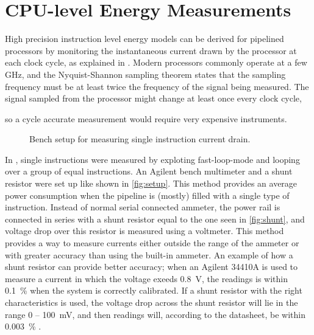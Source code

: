 \section{CPU-level Energy Measurements}
\label{sec:energymeasure}

High precision instruction level energy models can be derived for pipelined
processors by monitoring the instantaneous current drawn by the processor at
each clock cycle, as explained in \cite{nikolaidis2005instruction}. Modern
processors commonly operate at a few GHz, and the Nyquist-Shannon sampling theorem
\cite{nyquist1928certain} states that the sampling frequency must be at least
twice the frequency of the signal being measured. The signal sampled from the
processor might change at least once every clock cycle,

so a cycle accurate
measurement would require very expensive instruments.

\begin{figure}[tbh]
    \centering
    
    \caption{Bench setup for measuring single instruction current drain.}
    \label{fig:setup}
\end{figure}

In \cite{rundehvatum2013exploring}, single instructions were measured by
exploting fast-loop-mode and looping over a group of equal instructions. An
Agilent bench multimeter and a shunt resistor were set up like shown in
\autoref{fig:setup}. This method provides an average power consumption when the
pipeline is (mostly) filled with a single type of instruction. Instead of normal
serial connected ammeter, the power rail is connected in series with a shunt
resistor equal to the one seen in \autoref{fig:shunt}, and voltage drop over
this resistor is measured using a voltmeter. This method provides a way to
measure currents either outside the range of the ammeter or with greater
accuracy than using the built-in ammeter. An example of how a shunt resistor can
provide better accuracy; when an Agilent 34410A is used to measure a current in
which the voltage exeeds 0.8~V, the readings is within 0.1~\% when the system is
correctly calibrated. If a shunt resistor with the right characteristics is
used, the voltage drop across the shunt resistor will lie in the range 0 --
100~mV, and then readings will, according to the datasheet, be within 0.003~\%
\cite{agilent34410a}.

